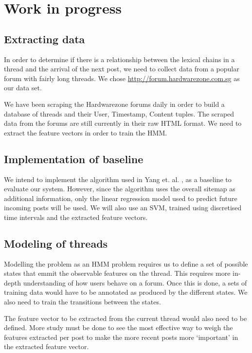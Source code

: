 \documentclass[12 pt]{article}
\begin{document}
\section{Work in progress}
\subsection{Extracting data}
In order to determine if there is a relationship between the lexical chains in a thread and the arrival of the next post, we need to collect data from a popular forum with fairly long threads. We chose \url{http://forum.hardwarezone.com.sg} as our data set.

We have been scraping the Hardwarezone forums daily in order to build a database of threads and their User, Timestamp, Content tuples. The scraped data from the forums are still currently in their raw HTML format. We need to extract the feature vectors in order to train the HMM.
\subsection{Implementation of baseline}
We intend to implement the algorithm used in Yang et. al. \cite{Yang2009}, as a baseline to evaluate our system. However, since the algorithm uses the overall sitemap as additional information, only the linear regression model used to predict future incoming posts will be used. We will also use an SVM, trained using discretised time intervals and the extracted feature vectors.

\subsection{Modeling of threads}
Modelling the problem as an HMM problem requires us to define a set of possible states that emmit the observable features on the thread. This requires more in-depth understanding of how users behave on a forum. Once this is done, a sets of training data would have to be annotated as produced by the different states. We also need to train the transitions between the states.

The feature vector to be extracted from the current thread would also need to be defined. More study must be done to see the most effective way to weigh the features extracted per post to make the more recent posts more `important' in the extracted feature vector.
\end{document}
